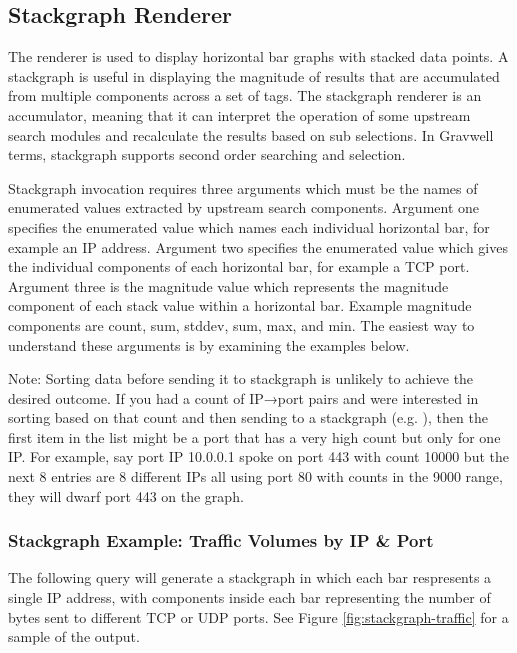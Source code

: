 \subsection{Stackgraph Renderer}

The  renderer is used to display horizontal bar graphs
with stacked data points. A stackgraph is useful in displaying the
magnitude of results that are accumulated from multiple components
across a set of tags. The stackgraph renderer is an accumulator,
meaning that it can interpret the operation of some upstream search
modules and recalculate the results based on sub selections. In Gravwell
terms, stackgraph supports second order searching and selection.

Stackgraph invocation requires three arguments which must be the names
of enumerated values extracted by upstream search components. Argument
one specifies the enumerated value which names each individual
horizontal bar, for example an IP address. Argument two specifies the
enumerated value which gives the individual components of each
horizontal bar, for example a TCP port. Argument three is the magnitude
value which represents the magnitude component of each stack value
within a horizontal bar. Example magnitude components are count, sum,
stddev, sum, max, and min. The easiest way to understand these arguments
is by examining the examples below.

Note: Sorting data before sending it to stackgraph is unlikely to
achieve the desired outcome. If you had a count of IP→port pairs
and were interested in sorting based on that count and then sending to a
stackgraph (e.g. ), then the first item in the
list might be a port that has a very high count but only for one IP. For
example, say port IP 10.0.0.1 spoke on port 443 with count 10000 but the
next 8 entries are 8 different IPs all using port 80 with counts in the
9000 range, they will dwarf port 443 on the graph.

\subsubsection{Stackgraph Example: Traffic Volumes by IP \& Port}

The following query will generate a stackgraph in which each bar respresents
a single IP address, with components inside each bar representing the number
of bytes sent to different TCP or UDP ports. See Figure \ref{fig:stackgraph-traffic}
for a sample of the output.

